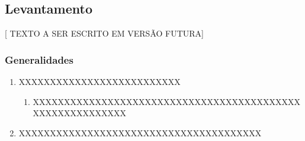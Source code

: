 \subsection{Levantamento} \label{subsection: etapa-LV}
[ TEXTO A SER ESCRITO EM VERSÃO FUTURA]

\subsubsection{Generalidades}
	\begin{enumerate}

		\item XXXXXXXXXXXXXXXXXXXXXXXXXX
			\begin{enumerate}
				
				\item XXXXXXXXXXXXXXXXXXXXXXXXXXXXXXXXXXXXXXXXXXXXXXXXXXXXXXXXXX
			
			\end{enumerate}
		
		\item XXXXXXXXXXXXXXXXXXXXXXXXXXXXXXXXXXXXXXX
	\end{enumerate}

